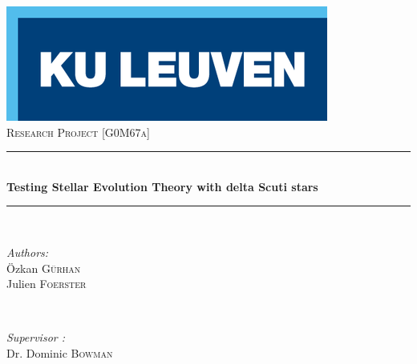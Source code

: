 \documentclass[12pt]{article}
\begin{document}
\begin{titlepage}

\newcommand{\HRule}{\rule{\linewidth}{0.5mm}} %

\center %
 

\includegraphics[scale = 0.5]{logokul.png}\\[2cm]

\textsc{\Large Research Project [G0M67a]}\\[1cm] %

%	

\HRule \\[0.4cm]
{ \huge \bfseries{Testing Stellar Evolution Theory with
delta Scuti stars} }\\[0.4cm] %
\HRule \\[4cm]
 

\begin{minipage}{0.4\textwidth}
\begin{flushleft} \large
\emph{Authors:}\\
Özkan \textsc{Gürhan}\\
Julien \textsc{Foerster} %
\end{flushleft}
\end{minipage}
~
\begin{minipage}{0.4\textwidth}
\begin{flushright} \large
\emph{Supervisor :} \\
Dr. Dominic \textsc{Bowman} %
\end{flushright}
\end{minipage}\\[2cm]


\end{titlepage}
\end{document}
